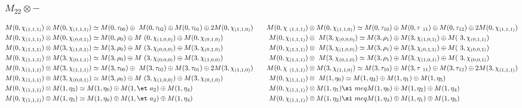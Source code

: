 \subsubsection{$M_22\otimes -$}
\begin{align*}
M(0,\chi_{(1,1,1)}) &\otimes M(0,\chi_{(1,1,1)}) \simeq M(0,\tau_{00}) \oplus \
M(0,\tau_{02}) \oplus M(0,\tau_{01}) \oplus 2 M(0,\chi_{(1,1,0)}) &&& M(0,\chi\
_{(1,1,1)}) &\otimes M(0,\chi_{(1,1,0)}) \simeq M(0,\tau_{10}) \oplus M(0,\tau\
_{11}) \oplus M(0,\tau_{12}) \oplus 2 M(0,\chi_{(1,1,1)})\\
M(0,\chi_{(1,1,1)}) &\otimes M(0,\chi_{(0,0,1)}) \simeq M(0,\rho_{0}) \oplus M\
(0,\chi_{(1,0,0)}) \oplus M(0,\chi_{(0,1,0)}) &&& M(0,\chi_{(1,1,1)}) &\otimes\
 M(3,\chi_{(0,0,0)}) \simeq M(3,\rho_{1}) \oplus M(3,\chi_{(1,0,1)}) \oplus M(\
3,\chi_{(0,1,1)})\\
M(0,\chi_{(1,1,1)}) &\otimes M(3,\chi_{(1,0,1)}) \simeq M(3,\rho_{0}) \oplus M\
(3,\chi_{(0,0,0)}) \oplus M(3,\chi_{(0,1,0)}) &&& M(0,\chi_{(1,1,1)}) &\otimes\
 M(3,\chi_{(1,0,0)}) \simeq M(3,\rho_{1}) \oplus M(3,\chi_{(0,1,1)}) \oplus M(\
3,\chi_{(0,0,1)})\\
M(0,\chi_{(1,1,1)}) &\otimes M(3,\chi_{(0,1,1)}) \simeq M(3,\rho_{0}) \oplus M\
(3,\chi_{(0,0,0)}) \oplus M(3,\chi_{(1,0,0)}) &&& M(0,\chi_{(1,1,1)}) &\otimes\
 M(3,\chi_{(0,1,0)}) \simeq M(3,\rho_{1}) \oplus M(3,\chi_{(1,0,1)}) \oplus M(\
3,\chi_{(0,0,1)})\\
M(0,\chi_{(1,1,1)}) &\otimes M(3,\chi_{(1,1,1)}) \simeq M(3,\tau_{00}) \oplus \
M(3,\tau_{02}) \oplus M(3,\tau_{01}) \oplus 2 M(3,\chi_{(1,1,0)}) &&& M(0,\chi\
_{(1,1,1)}) &\otimes M(3,\chi_{(1,1,0)}) \simeq M(3,\tau_{10}) \oplus M(3,\tau\
_{11}) \oplus M(3,\tau_{12}) \oplus 2 M(3,\chi_{(1,1,1)})\\
M(0,\chi_{(1,1,1)}) &\otimes M(3,\chi_{(0,0,1)}) \simeq M(3,\rho_{0}) \oplus M\
(3,\chi_{(1,0,0)}) \oplus M(3,\chi_{(0,1,0)}) &&& M(0,\chi_{(1,1,1)}) &\otimes\
 M(1,\eta_{0}) \simeq M(1,\eta_{3}) \oplus M(1,\eta_{1}) \oplus M(1,\eta_{5})\
\\
M(0,\chi_{(1,1,1)}) &\otimes M(1,\eta_{3}) \simeq M(1,\eta_{0}) \oplus M(1,\et\
a_{2}) \oplus M(1,\eta_{4}) &&& M(0,\chi_{(1,1,1)}) &\otimes M(1,\eta_{1}) \si\
meq M(1,\eta_{0}) \oplus M(1,\eta_{2}) \oplus M(1,\eta_{4})\\
M(0,\chi_{(1,1,1)}) &\otimes M(1,\eta_{5}) \simeq M(1,\eta_{0}) \oplus M(1,\et\
a_{2}) \oplus M(1,\eta_{4}) &&& M(0,\chi_{(1,1,1)}) &\otimes M(1,\eta_{2}) \si\
meq M(1,\eta_{3}) \oplus M(1,\eta_{1}) \oplus M(1,\eta_{5})\\

\end{align*}
